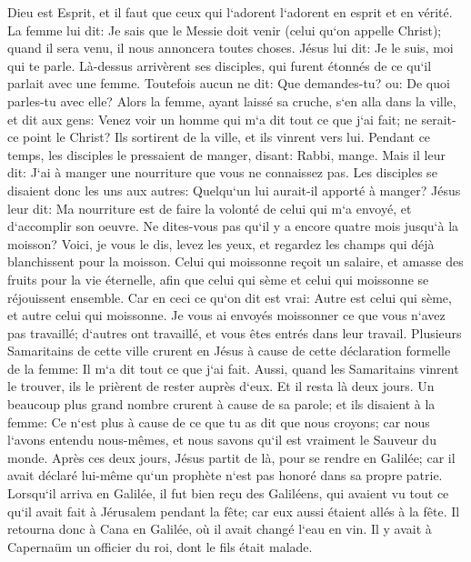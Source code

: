 \verse Dieu est Esprit, et il faut que ceux qui l`adorent l`adorent en esprit et en vérité. 
\verse La femme lui dit: Je sais que le Messie doit venir (celui qu`on appelle Christ); quand il sera venu, il nous annoncera toutes choses. 
\verse Jésus lui dit: Je le suis, moi qui te parle. 
\verse Là-dessus arrivèrent ses disciples, qui furent étonnés de ce qu`il parlait avec une femme. Toutefois aucun ne dit: Que demandes-tu? ou: De quoi parles-tu avec elle? 
\verse Alors la femme, ayant laissé sa cruche, s`en alla dans la ville, et dit aux gens: 
\verse Venez voir un homme qui m`a dit tout ce que j`ai fait; ne serait-ce point le Christ? 
\verse Ils sortirent de la ville, et ils vinrent vers lui. 
\verse Pendant ce temps, les disciples le pressaient de manger, disant: Rabbi, mange. 
\verse Mais il leur dit: J`ai à manger une nourriture que vous ne connaissez pas. 
\verse Les disciples se disaient donc les uns aux autres: Quelqu`un lui aurait-il apporté à manger? 
\verse Jésus leur dit: Ma nourriture est de faire la volonté de celui qui m`a envoyé, et d`accomplir son oeuvre. 
\verse Ne dites-vous pas qu`il y a encore quatre mois jusqu`à la moisson? Voici, je vous le dis, levez les yeux, et regardez les champs qui déjà blanchissent pour la moisson. 
\verse Celui qui moissonne reçoit un salaire, et amasse des fruits pour la vie éternelle, afin que celui qui sème et celui qui moissonne se réjouissent ensemble. 
\verse Car en ceci ce qu`on dit est vrai: Autre est celui qui sème, et autre celui qui moissonne. 
\verse Je vous ai envoyés moissonner ce que vous n`avez pas travaillé; d`autres ont travaillé, et vous êtes entrés dans leur travail. 
\verse Plusieurs Samaritains de cette ville crurent en Jésus à cause de cette déclaration formelle de la femme: Il m`a dit tout ce que j`ai fait. 
\verse Aussi, quand les Samaritains vinrent le trouver, ils le prièrent de rester auprès d`eux. Et il resta là deux jours. 
\verse Un beaucoup plus grand nombre crurent à cause de sa parole; 
\verse et ils disaient à la femme: Ce n`est plus à cause de ce que tu as dit que nous croyons; car nous l`avons entendu nous-mêmes, et nous savons qu`il est vraiment le Sauveur du monde. 
\verse Après ces deux jours, Jésus partit de là, pour se rendre en Galilée; 
\verse car il avait déclaré lui-même qu`un prophète n`est pas honoré dans sa propre patrie. 
\verse Lorsqu`il arriva en Galilée, il fut bien reçu des Galiléens, qui avaient vu tout ce qu`il avait fait à Jérusalem pendant la fête; car eux aussi étaient allés à la fête. 
\verse Il retourna donc à Cana en Galilée, où il avait changé l`eau en vin. Il y avait à Capernaüm un officier du roi, dont le fils était malade. 
